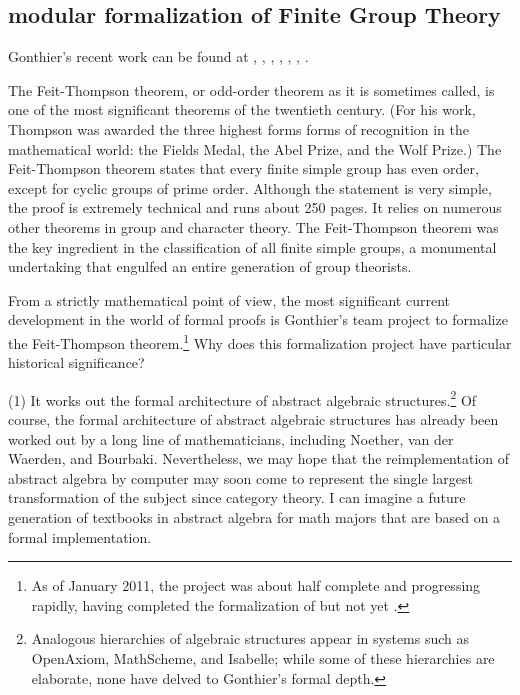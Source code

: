 \documentclass{llncs}
\begin{document}
\subsection{modular formalization of Finite Group Theory}

Gonthier's recent work can be found at
\cite{gonSSRE}, \cite{gonPFSF}, \cite{gonPMS}, \cite{gonMF},
\cite{gonHoc}, \cite{gonISSR}, \cite{gonC}.

The Feit-Thompson theorem, or odd-order theorem as it is sometimes
called, is one of the most significant theorems of the twentieth
century.  (For his work, Thompson was awarded the three highest forms
forms of recognition in the mathematical world: the Fields Medal, the
Abel Prize, and the Wolf Prize.)  The Feit-Thompson theorem states
that every finite simple group has even order, except for cyclic
groups of prime order.  Although the statement is very simple, the
proof is extremely technical and runs about 250 pages. It relies on
numerous other theorems in group and character theory.  The
Feit-Thompson theorem was the key ingredient in the classification of
all finite simple groups, a monumental undertaking that engulfed an
entire generation of group theorists.



From a strictly mathematical point of view, the most significant
current development in the world of formal proofs is Gonthier's team
project to formalize the Feit-Thompson theorem.\footnote{As of January
  2011, the project was about half complete and progressing rapidly,
  having completed the formalization of \cite{BG94} but not yet
  \cite{P00}.}  Why does this formalization project have particular
historical significance?

(1) It works out the formal architecture of abstract algebraic
structures.\footnote{Analogous hierarchies of algebraic structures
  appear in systems such as OpenAxiom, MathScheme, and Isabelle; while some of these
  hierarchies are elaborate, none have delved to Gonthier's formal
  depth.}  Of course, the formal architecture of abstract algebraic
structures has already been worked out by a long line of
mathematicians, including Noether, van der Waerden, and Bourbaki.
Nevertheless, we may hope that the reimplementation of abstract
algebra by computer may soon come to represent the single largest
transformation of the subject since category theory.  I can imagine a
future generation of textbooks in abstract algebra for math majors
that are based on a formal implementation.
\end{document}
